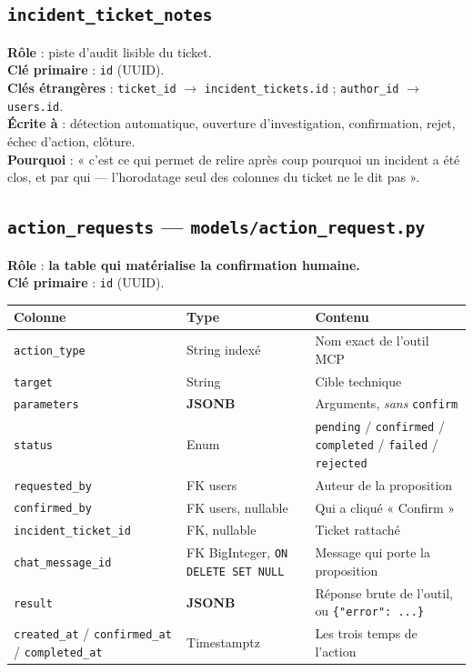 \documentclass[11pt,a4paper]{report}
\newcommand{\file}[1]{\texttt{\small #1}}
\newcommand{\tbl}[1]{\texttt{\small\textcolor{oasisamber}{#1}}}
\newcommand{\arrowto}{\ensuremath{\rightarrow}}
\begin{document}
\subsection{\tbl{incident\_ticket\_notes}}

\textbf{Rôle} : piste d'audit lisible du ticket.\\
\textbf{Clé primaire} : \texttt{id} (UUID).\\
\textbf{Clés étrangères} : \texttt{ticket\_id} \arrowto{}
\texttt{incident\_tickets.id} ; \texttt{author\_id} \arrowto{} \texttt{users.id}.\\
\textbf{Écrite à} : détection automatique, ouverture d'investigation,
confirmation, rejet, échec d'action, clôture.\\
\textbf{Pourquoi} : « c'est ce qui permet de relire après coup pourquoi un
incident a été clos, et par qui --- l'horodatage seul des colonnes du ticket ne
le dit pas ».

\subsection{\tbl{action\_requests} --- \file{models/action\_request.py}}

\textbf{Rôle} : \textbf{la table qui matérialise la confirmation humaine.}\\
\textbf{Clé primaire} : \texttt{id} (UUID).

\begin{longtable}{@{}p{3.8cm}p{2.9cm}p{7.9cm}@{}}
\toprule
\textbf{Colonne} & \textbf{Type} & \textbf{Contenu}\\
\midrule
\endhead
\texttt{action\_type} & String indexé & Nom exact de l'outil MCP\\
\texttt{target} & String & Cible technique\\
\texttt{parameters} & \textbf{JSONB} & Arguments, \emph{sans} \texttt{confirm}\\
\texttt{status} & Enum & \texttt{pending} / \texttt{confirmed} / \texttt{completed} / \texttt{failed} / \texttt{rejected}\\
\texttt{requested\_by} & FK users & Auteur de la proposition\\
\texttt{confirmed\_by} & FK users, nullable & Qui a cliqué « Confirm »\\
\texttt{incident\_ticket\_id} & FK, nullable & Ticket rattaché\\
\texttt{chat\_message\_id} & FK BigInteger, \texttt{ON DELETE SET NULL} & Message qui porte la proposition\\
\texttt{result} & \textbf{JSONB} & Réponse brute de l'outil, ou \texttt{\{"error": ...\}}\\
\texttt{created\_at} / \texttt{confirmed\_at} / \texttt{completed\_at} & Timestamptz & Les trois temps de l'action\\
\bottomrule
\end{longtable}
\end{document}

